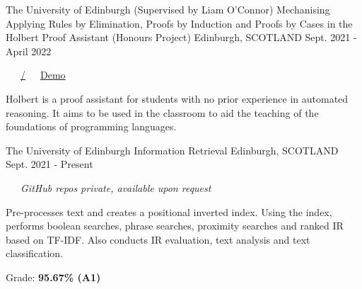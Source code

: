 \begin{cventries}
  \cventry
    {The University of Edinburgh (Supervised by Liam O'Connor)} %
    {Mechanising Applying Rules by Elimination, Proofs by Induction and Proofs by Cases in the Holbert Proof Assistant (Honours Project)} %
    {Edinburgh, SCOTLAND} %
    {Sept. 2021 - April 2022} %
    {
      \color{awesome} \color{graytext}\ \ \ \href{https://github.com/chrisjpm/holbert}{\faGithub\acvHeaderIconSep\@chrisjpm/\@holbert}\ \ \ \href{http://liamoc.net/holbert}{\faGlobe\acvHeaderIconSep\@Holbert Demo}%
      \vspace{1.6em}
      \begin{cvitems} %
        \item Holbert is a proof assistant for students with no prior experience in automated reasoning. It aims to be used in the classroom to aid the teaching of the foundations of programming languages.
      \end{cvitems}
    }
    
  \cventry
    {The University of Edinburgh} %
    {Information Retrieval} %
    {Edinburgh, SCOTLAND} %
    {Sept. 2021 - Present} %
    {
      \color{awesome}\color{graytext}\ \ \ \textit{GitHub repos private, available upon request}
      \vspace{1.6em}
      \begin{cvitems} %
        \item Pre-processes text and creates a positional inverted index. Using the index, performs boolean searches, phrase searches, proximity searches and ranked IR based on TF-IDF. Also conducts IR evaluation, text analysis and text classification.
        \item Grade: \textbf{95.67\% (A1)}
      \end{cvitems}
    }
    

\end{cventries}
